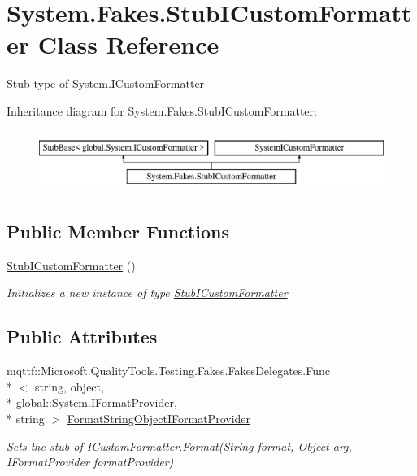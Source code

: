 \hypertarget{class_system_1_1_fakes_1_1_stub_i_custom_formatter}{\section{System.\-Fakes.\-Stub\-I\-Custom\-Formatter Class Reference}
\label{class_system_1_1_fakes_1_1_stub_i_custom_formatter}
}


Stub type of System.\-I\-Custom\-Formatter 


Inheritance diagram for System.\-Fakes.\-Stub\-I\-Custom\-Formatter\-:\begin{figure}[H]
\begin{center}
\leavevmode
\includegraphics[height=2.000000cm]{class_system_1_1_fakes_1_1_stub_i_custom_formatter}
\end{center}
\end{figure}
\subsection*{Public Member Functions}
\begin{DoxyCompactItemize}
\item 
\hyperlink{class_system_1_1_fakes_1_1_stub_i_custom_formatter_a730a978b33fb3733019a471fe40bc150}{Stub\-I\-Custom\-Formatter} ()
\begin{DoxyCompactList}\small\item\em Initializes a new instance of type \hyperlink{class_system_1_1_fakes_1_1_stub_i_custom_formatter}{Stub\-I\-Custom\-Formatter}\end{DoxyCompactList}\end{DoxyCompactItemize}
\subsection*{Public Attributes}
\begin{DoxyCompactItemize}
\item 
mqttf\-::\-Microsoft.\-Quality\-Tools.\-Testing.\-Fakes.\-Fakes\-Delegates.\-Func\\*
$<$ string, object, \\*
global\-::\-System.\-I\-Format\-Provider, \\*
string $>$ \hyperlink{class_system_1_1_fakes_1_1_stub_i_custom_formatter_ae288a470ace50b18f900b9c128654e0f}{Format\-String\-Object\-I\-Format\-Provider}
\begin{DoxyCompactList}\small\item\em Sets the stub of I\-Custom\-Formatter.\-Format(\-String format, Object arg, I\-Format\-Provider format\-Provider)\end{DoxyCompactList}\end{DoxyCompactItemize}


